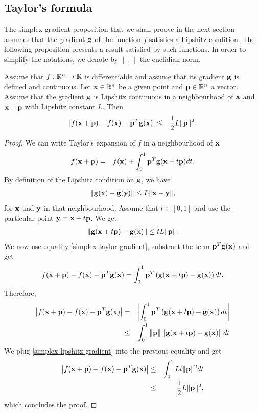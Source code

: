 \subsection{Taylor's formula}
\label{simplex-Taylor-integral-lipshitz}

The simplex gradient proposition that we shall proove in the 
next section assumes that the gradient $\mathbf{g}$ of the function $f$ satisfies 
a Lipshitz condition. The following proposition presents 
a result satisfied by such functions.
In order to simplify the notations, we denote by $\|.\|$ the 
euclidian norm.

\begin{proposition}
\label{simplex-prop-taylor-lipshitz}
Assume that $f:\mathbb{R}^n\rightarrow \mathbb{R}$ is differentiable and assume that its gradient $\mathbf{g}$
is defined and continuous. 
Let $\mathbf{x}\in\mathbb{R}^n$ be a given point and $\mathbf{p}\in\mathbb{R}^n$ a vector.
Assume that the gradient $\mathbf{g}$ is Lipshitz continuous in a 
neighbourhood of $\mathbf{x}$ and $\mathbf{x}+\mathbf{p}$ with Lipshitz constant
$L$. Then 
\begin{eqnarray}
|f(\mathbf{x}+\mathbf{p}) - f(\mathbf{x}) - \mathbf{p}^T \mathbf{g}(\mathbf{x}) |
&\leq& \frac{1}{2} L \|\mathbf{p}\|^2.
\end{eqnarray}
\end{proposition}

\begin{proof}
We can write Taylor's expansion of $f$ in a neighbourhood of $\mathbf{x}$
\begin{eqnarray}
\label{simplex-taylor-gradient}
f(\mathbf{x}+\mathbf{p}) &= & f(\mathbf{x}) + \int_0^1 \mathbf{p}^T \mathbf{g} (\mathbf{x}+t\mathbf{p}) dt.
\end{eqnarray}
By definition of the Lipshitz condition on $\mathbf{g}$, we have 
\begin{eqnarray}
\| \mathbf{g}(\mathbf{x}) - \mathbf{g}(\mathbf{y}) \| \leq L \|\mathbf{x} - \mathbf{y}\|,
\end{eqnarray}
for $\mathbf{x}$ and $\mathbf{y}$ in that neighbourhood.
Assume that $t\in[0,1]$ and use the particular point $\mathbf{y} = \mathbf{x}+t\mathbf{p}$.
We get
\begin{eqnarray}
\label{simplex-lipshitz-gradient}
\| \mathbf{g}(\mathbf{x}+t\mathbf{p}) - \mathbf{g}(\mathbf{x}) \| \leq t L \|\mathbf{p}\|.
\end{eqnarray}
We now use equality \ref{simplex-taylor-gradient}, substract the 
term $\mathbf{p}^T \mathbf{g}(\mathbf{x})$ and get
\begin{eqnarray}
f(\mathbf{x}+\mathbf{p}) - f(\mathbf{x}) - \mathbf{p}^T \mathbf{g}(\mathbf{x}) = \int_0^1 \mathbf{p}^T  \left( \mathbf{g} (\mathbf{x}+t\mathbf{p})  - \mathbf{g}(\mathbf{x}) \right) dt.
\end{eqnarray}
Therefore, 
\begin{eqnarray}
\left|f(\mathbf{x}+\mathbf{p}) - f(\mathbf{x}) - \mathbf{p}^T \mathbf{g}(\mathbf{x}) \right|
&=& \left|\int_0^1 \mathbf{p}^T  \left( \mathbf{g} (\mathbf{x}+t\mathbf{p})  - \mathbf{g}(\mathbf{x}) \right) dt \right|\\
&\leq & \int_0^1 \|\mathbf{p}\| \left\| \mathbf{g} (\mathbf{x}+t\mathbf{p})  - \mathbf{g}(\mathbf{x}) \right\| dt
\end{eqnarray}
We plug \ref{simplex-lipshitz-gradient} into the previous equality and get
\begin{eqnarray}
\left|f(\mathbf{x}+\mathbf{p}) - f(\mathbf{x}) - \mathbf{p}^T \mathbf{g}(\mathbf{x}) \right| 
&\leq & \int_0^1 L t \|\mathbf{p}\|^2 dt \\
&\leq& \frac{1}{2} L \|\mathbf{p}\|^2,
\end{eqnarray}
which concludes the proof.
\end{proof}

